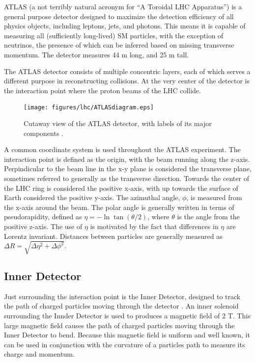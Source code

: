 ATLAS (a not terribly natural acronym for ``A Toroidal LHC Apparatus'') is a general purpose detector designed to maximize the detection efficiency of all physics objects, including leptons, jets, and photons. This means it is capable of measuring all (sufficiently long-lived) SM particles, with the exception of neutrinos, the presence of which can be inferred based on missing transverse momentum. The detector measures 44 m long, and 25 m tall. 

The ATLAS detector consists of multiple concentric layers, each of which serves a different purpose in reconstructing collisions. At the very center of the detector is the interaction point where the proton beams of the LHC collide. 

\begin{figure}[H]
\centering
   \texttt{[image: figures/lhc/ATLASdiagram.eps]}
\caption{Cutaway view of the ATLAS detector, with labels of its major components \cite{ATLAS_figure}.}
\label{fig:ATLAS}
\end{figure}

A common coordinate system is used throughout the ATLAS experiment. The interaction point is defined as the origin, with the beam running along the z-axis. Perpindicular to the beam line in the x-y plane is considered the transverse plane, sometimes referred to generally as the transverse direction. Towards the center of the LHC ring is considered the positive x-axis, with up towards the surface of Earth considered the positive y-axis. The azimuthal angle, $\phi$, is measured from the x-axis around the beam. The polar angle is generally written in terms of pseudorapidity, defined as $\eta = -\ln\tan(\theta/2)$, where $\theta$ is the angle from the positive z-axis. The use of $\eta$ is motivated by the fact that differences in $\eta$ are Lorentz invariant. Distances between particles are generally measured as $\Delta R = \sqrt{\Delta\eta^2 + \Delta\phi^2}$.

\subsection{Inner Detector}
\label{sec:innerDetector}

Just surrounding the interaction point is the Inner Detector, designed to track the path of charged particles moving through the detector \cite{IDET-2010-01}. An inner solenoid surrounding the Innder Detector is used to produces a magnetic field of 2 T. This large magnetic field causes the path of charged particles moving through the Inner Detector to bend. Because this magnetic field is uniform and well known, it can be used in conjunction with the curvature of a particles path to measure its charge and momentum.


